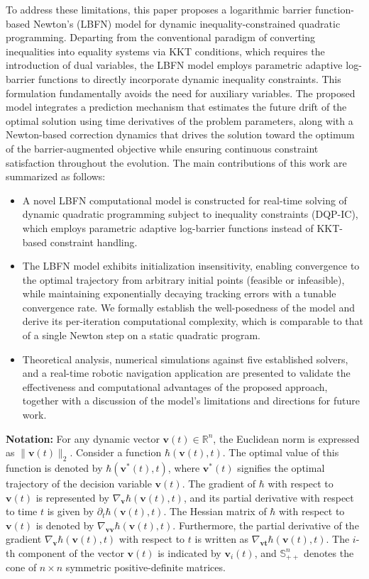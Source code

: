 \documentclass[pdflatex,sn-mathphys,Numbered]{sn-jnl}
\theoremstyle{thmstyleone}
\theoremstyle{thmstyletwo}
\theoremstyle{thmstylethree}
\begin{document}
To address these limitations, this paper proposes a logarithmic barrier function-based Newton's (LBFN) model for dynamic inequality-constrained quadratic programming. Departing from the conventional paradigm of converting inequalities into equality systems via KKT conditions, which requires the introduction of dual variables, the LBFN model employs parametric adaptive log-barrier functions to directly incorporate dynamic inequality constraints. This formulation fundamentally avoids the need for auxiliary variables. The proposed model integrates a prediction mechanism that estimates the future drift of the optimal solution using time derivatives of the problem parameters, along with a Newton-based correction dynamics that drives the solution toward the optimum of the barrier-augmented objective while ensuring continuous constraint satisfaction throughout the evolution. The main contributions of this work are summarized as follows:

\begin{itemize}
\item A novel LBFN computational model is constructed for real-time solving of dynamic quadratic programming subject to inequality constraints (DQP-IC), which employs parametric adaptive log-barrier functions instead of KKT-based constraint handling.

\item The LBFN model exhibits initialization insensitivity, enabling convergence to the optimal trajectory from arbitrary initial points (feasible or infeasible), while maintaining exponentially decaying tracking errors with a tunable convergence rate. We formally establish the well-posedness of the model and derive its per-iteration computational complexity, which is comparable to that of a single Newton step on a static quadratic program.

\item Theoretical analysis, numerical simulations against five established solvers, and a real-time robotic navigation application are presented to validate the effectiveness and computational advantages of the proposed approach, together with a discussion of the model's limitations and directions for future work.
\end{itemize}

\textbf{Notation:} For any dynamic vector $\bm{v}(t) \in \mathbb{R}^{n}$, the Euclidean norm is expressed as $\|\bm{v}(t)\|_{2}$. Consider a function $\hbar(\bm{v}(t), t)$. The optimal value of this function is denoted by $\hbar(\bm{v}^{*}(t),t)$, where $\bm{v}^{*}(t)$ signifies the optimal trajectory of the decision variable $\bm{v}(t)$. The gradient of $\hbar$ with respect to $\bm{v}(t)$ is represented by $\nabla_{\bm{v}}\hbar(\bm{v}(t), t)$, and its partial derivative with respect to time $t$ is given by $\partial_{t}\hbar(\bm{v}(t), t)$. The Hessian matrix of $\hbar$ with respect to $\bm{v}(t)$ is denoted by $\nabla_{\bm{vv}}\hbar(\bm{v}(t), t)$. Furthermore, the partial derivative of the gradient $\nabla_{\bm{v}}\hbar(\bm{v}(t), t)$ with respect to $t$ is written as $\nabla_{\bm{vt}}\hbar(\bm{v}(t), t)$. The $i$-th component of the vector $\bm{v}(t)$ is indicated by $\bm{v}_{i}(t)$, and $\mathbb{S}^n_{++}$ denotes the cone of $n\times n$ symmetric positive-definite matrices.
\end{document}
